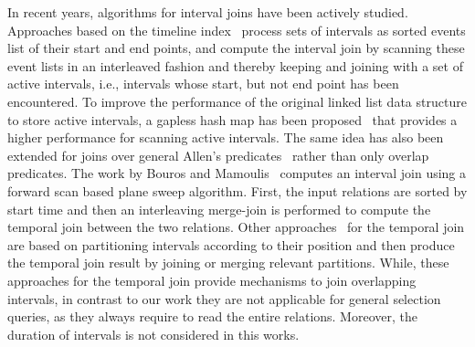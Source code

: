 \documentclass[sigconf,nonacm,anonymous]{acmart}
\theoremstyle{definition}
\begin{document}
In recent years, algorithms for interval joins have been actively studied. Approaches based on the timeline index~\cite{DBLP:conf/sigmod/KaufmannMVFKFM13} process sets of intervals as sorted events list of their start and end points, and compute the interval join by scanning these event lists in an interleaved fashion and thereby keeping and joining with a set of active intervals, i.e., intervals whose start, but not end point has been encountered. To improve the performance of the original linked list data structure to store active intervals, a gapless hash map has been proposed~\cite{DBLP:conf/icde/PiatovHD16} that provides a higher performance for scanning active intervals. The same idea has also been extended for joins over general Allen's predicates~\cite{DBLP:journals/vldb/PiaDHP21} rather than only overlap predicates. The work by Bouros and
Mamoulis~\cite{DBLP:journals/pvldb/BourosM17} computes an interval join using a forward scan based
plane sweep algorithm. First, the input relations are sorted by start time and then an interleaving merge-join is performed to compute the temporal join between the two relations. Other approaches~\cite{DBLP:conf/sigmod/DignosBG14,DBLP:journals/vldb/CafagnaB17} for the temporal join are based on
partitioning intervals according to their position and then produce the temporal join result by joining or merging relevant partitions. While, these approaches for the temporal join provide mechanisms to join overlapping intervals, in contrast to our work they are not applicable for general selection queries, as they always require to read the entire relations. Moreover, the duration of intervals is not considered in this works.


\end{document}
